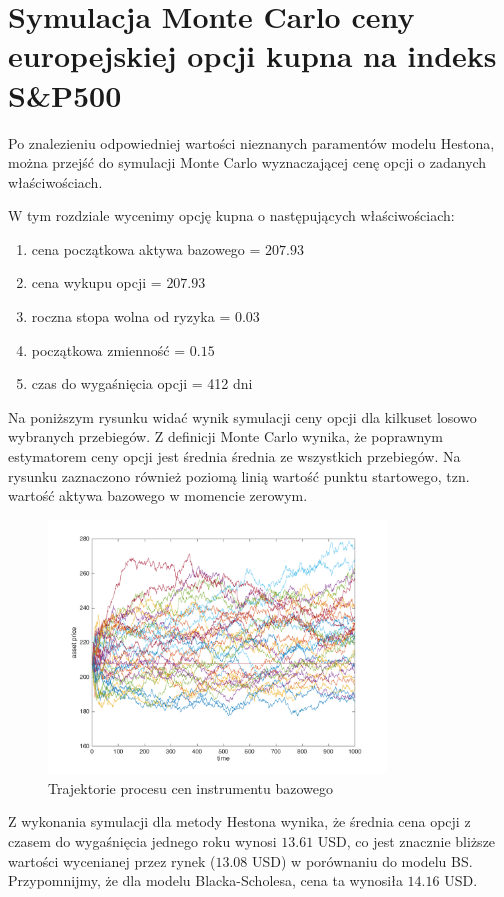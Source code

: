 \documentclass{pracamgr}
\begin{document}
\section{Symulacja Monte Carlo ceny europejskiej opcji kupna na indeks S\&P500}

Po znalezieniu odpowiedniej wartości nieznanych paramentów modelu Hestona, można 
przejść do symulacji Monte Carlo wyznaczającej cenę opcji o zadanych właściwościach.

W tym rozdziale wycenimy opcję kupna o następujących właściwościach:
\begin{enumerate}
  \item cena początkowa aktywa bazowego = $207.93$
  \item cena wykupu opcji = $207.93$ 
  \item roczna stopa wolna od ryzyka = $0.03$
  \item początkowa zmienność =  $0.15$
  \item czas do wygaśnięcia opcji = 412 dni
\end{enumerate}
 
Na poniższym rysunku widać wynik symulacji ceny opcji dla kilkuset losowo wybranych przebiegów.
Z definicji Monte Carlo wynika, że poprawnym estymatorem ceny
opcji jest średnia średnia ze wszystkich przebiegów.
Na rysunku zaznaczono również poziomą linią wartość punktu startowego, tzn. wartość 
aktywa bazowego w momencie zerowym.

\begin{figure}
\centering
  \includegraphics[width=0.80\textwidth]{../chartHeston.png}
  \caption{Trajektorie procesu cen instrumentu bazowego}
  \label{fig:hestonAssetPaths}
\end{figure}


Z wykonania symulacji dla metody Hestona wynika, że średnia cena opcji z czasem do wygaśnięcia 
jednego roku wynosi $13.61$ USD, 
co jest znacznie bliższe wartości wycenianej przez rynek ($13.08$ USD) w porównaniu do modelu BS. 
Przypomnijmy, że dla modelu Blacka-Scholesa, cena ta wynosiła $14.16$ USD.
\end{document}
